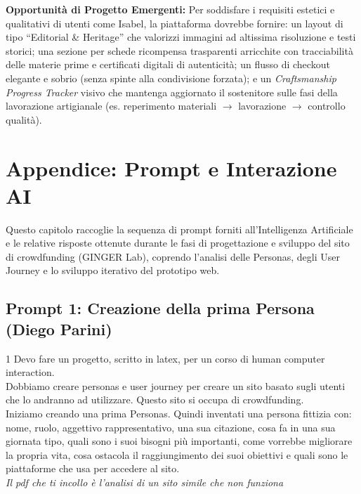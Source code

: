 \documentclass[11pt,a4paper]{article}
\begin{document}
\begin{enumerate}
    \end{enumerate}

    \vspace{0.3cm}
    \noindent\textbf{Opportunità di Progetto Emergenti:} Per soddisfare i requisiti estetici e qualitativi di utenti come Isabel, la piattaforma dovrebbe fornire: un layout di tipo ``Editorial \& Heritage'' che valorizzi immagini ad altissima risoluzione e testi storici; una sezione per schede ricompensa trasparenti arricchite con tracciabilità delle materie prime e certificati digitali di autenticità; un flusso di checkout elegante e sobrio (senza spinte alla condivisione forzata); e un \textit{Craftsmanship Progress Tracker} visivo che mantenga aggiornato il sostenitore sulle fasi della lavorazione artigianale (es. reperimento materiali $\rightarrow$ lavorazione $\rightarrow$ controllo qualità).
    \section{Appendice: Prompt e Interazione AI}
    \label{sec:appendice}

    Questo capitolo raccoglie la sequenza di prompt forniti all'Intelligenza Artificiale e le relative risposte ottenute durante le fasi di progettazione e sviluppo del sito di crowdfunding (GINGER Lab), coprendo l'analisi delle Personas, degli User Journey e lo sviluppo iterativo del prototipo web.

    \subsection{Prompt 1: Creazione della prima Persona (Diego Parini)}
    \label{prompt:1}
    \begin{promptbox}{1}
        Devo fare un progetto, scritto in latex, per un corso di human computer interaction.\\
        Dobbiamo creare personas e user journey per creare un sito basato sugli utenti che lo andranno ad utilizzare. Questo sito si occupa di crowdfunding.\\
        Iniziamo creando una prima Personas. Quindi inventati una persona fittizia con: nome, ruolo, aggettivo rappresentativo, una sua citazione, cosa fa in una sua giornata tipo, quali sono i suoi bisogni più importanti, come vorrebbe migliorare la propria vita, cosa ostacola il raggiungimento dei suoi obiettivi e quali sono le piattaforme che usa per accedere al sito.\\
        \vspace{0.2cm}
        \textit{Il pdf che ti incollo è l'analisi di un sito simile che non funziona}
    \end{promptbox}
\end{document}
